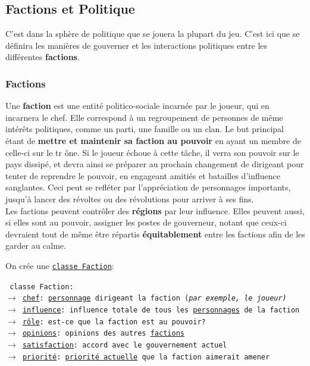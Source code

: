 \documentclass{article}
\newcommand{\ulcolor}[2][class]{\setulcolor{#1}\ul{#2}}
\newcommand{\ulcolor}[2][var]{\setulcolor{#1}\ul{#2}}
\newcommand{\ulcolor}[2][func]{\setulcolor{#1}\ul{#2}}
\newcommand*{\mybox}[2]{\colorbox{#1!30}{\parbox{.98\linewidth}{#2}}}
\newcommand\tab[1][0.5cm]{\hspace*{#1}}
\newcommand{\genbox}[1]{\mybox{verylightgray}{#1}}
\newcommand{\classbox}[1]{\mybox{palegreen}{\texttt{\textcolor{codeColour}{#1}}}}
\newcommand{\class}[1]{\texttt{\textcolor{codeColour}{\ulcolor[class]{#1}}}}
\newcommand{\var}[1]{\texttt{\textcolor{codeColour}{\ulcolor[var]{#1}}}}
\begin{document}
        \subsection{Factions et Politique}
            C'est dans la sphère de politique que se jouera la plupart du jeu. C'est ici que se définira les manières de gouverner et les interactions politiques entre les différentes \textbf{factions}.
            
            \subsubsection{Factions}
                Une \textbf{faction} est une entité politico-sociale incarnée par le joueur, qui en incarnera le chef. Elle correspond à un regroupement de personnes de même intérêts politiques, comme un parti, une famille ou un clan. Le but principal étant de \textbf{mettre et maintenir sa faction au pouvoir} en ayant un membre de celle-ci sur le tr    ône. Si le joueur échoue à cette tâche, il verra son pouvoir sur le pays dissipé, et devra ainsi se préparer au prochain changement de dirigeant pour tenter de reprendre le pouvoir, en engageant amitiés et batailles d'influence sanglantes. Ceci peut se refléter par l'appréciation de personnages importants, jusqu'à lancer des révoltes ou des révolutions pour arriver à ses fins. \\
                Les factions peuvent contrôler des \textbf{régions} par leur influence. Elles peuvent aussi, si elles sont au pouvoir, assigner les postes de gouverneur, notant que ceux-ci devraient tout de même être répartis \textbf{équitablement} entre les factions afin de les garder au calme.

                \tab \genbox{
                    On crée une \class{classe Faction}: \\
                    \tab \classbox{
                            classe Faction: \\
                            $\rightarrow$ \var{chef}: \class{personnage} dirigeant la faction (\textit{par exemple, le joueur)} \\
                            $\rightarrow$ \var{influence}: influence totale de tous les \class{personnages} de la faction \\
                            $\rightarrow$ \var{r\^ole}: est-ce que la faction est au pouvoir? \\
                            $\rightarrow$ \var{opinions}: opinions des autres \class{factions} \\
                            $\rightarrow$ \var{satisfaction}: accord avec le gouvernement actuel \\
                            $\rightarrow$ \var{priorit\'e}: \var{priorit\'e actuelle} que la faction aimerait amener \\
                    } 
                }
\end{document}
